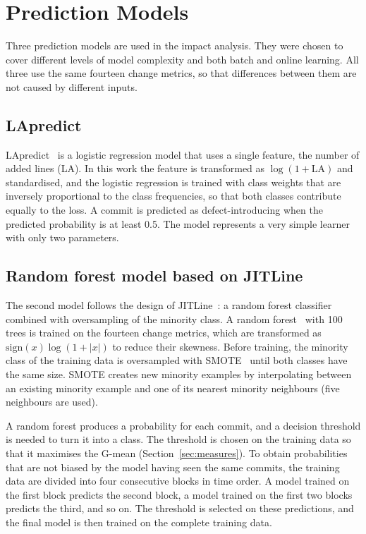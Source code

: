 \documentclass[12pt,a4paper,oneside]{report}
\begin{document}
\section{Prediction Models}\label{sec:models}

Three prediction models are used in the impact analysis. They were chosen to
cover different levels of model complexity and both batch and online
learning. All three use the same fourteen change metrics, so that differences
between them are not caused by different inputs.

\subsection{LApredict}

LApredict~\cite{zeng2021lapredict} is a logistic regression model that uses a
single feature, the number of added lines (LA). In this work the feature is
transformed as $\log(1+\mathrm{LA})$ and standardised, and the logistic
regression is trained with class weights that are inversely proportional to
the class frequencies, so that both classes contribute equally to the loss. A
commit is predicted as defect-introducing when the predicted probability is
at least 0.5. The model represents a very simple learner with only two
parameters.

\subsection{Random forest model based on JITLine}

The second model follows the design of
JITLine~\cite{pornprasit2021jitline}: a random forest classifier combined
with oversampling of the minority class. A random
forest~\cite{breiman2001rf} with 100 trees is trained on the fourteen change
metrics, which are transformed as $\mathrm{sign}(x)\log(1+|x|)$ to reduce
their skewness. Before training, the minority class of the training data is
oversampled with SMOTE~\cite{chawla2002smote} until both classes have the
same size. SMOTE creates new minority examples by interpolating between an
existing minority example and one of its nearest minority neighbours (five
neighbours are used).

A random forest produces a probability for each commit, and a decision
threshold is needed to turn it into a class. The threshold is chosen on the
training data so that it maximises the G-mean (Section~\ref{sec:measures}).
To obtain probabilities that are not biased by the model having seen the same
commits, the training data are divided into four consecutive blocks in time
order. A model trained on the first block predicts the second block, a model
trained on the first two blocks predicts the third, and so on. The threshold
is selected on these predictions, and the final model is then trained on the
complete training data.
\end{document}
